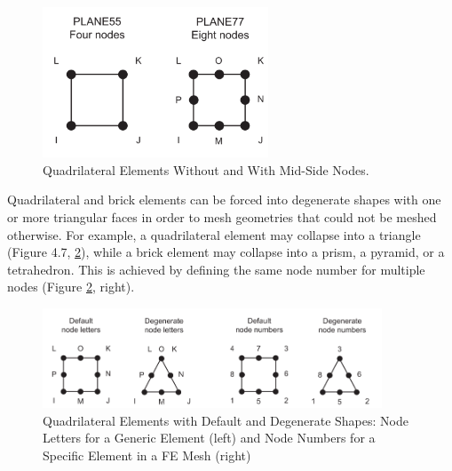 \documentclass[letterpaper,pdftex]{article}
\begin{document}
\begin{figure}[h]
   \centering
   \includegraphics[width=0.6\textwidth]{nodesinelement}
   \caption{Quadrilateral Elements Without and With Mid-Side Nodes.}
   \label{fig:nodes}
\end{figure}

Quadrilateral and brick elements can be forced into degenerate shapes with one or more triangular faces in order to mesh geometries that could not be meshed otherwise. For example, a quadrilateral element may collapse into a triangle (Figure 4.7, \ref{fig:nodes_elements}), while a brick element may collapse into a prism, a pyramid, or a tetrahedron. This is achieved by defining the same node number for multiple nodes (Figure \ref{fig:nodes_elements}, right).

\begin{figure}[h]
   \centering
   \includegraphics[width=0.9\textwidth]{shapesandnodes}
   \caption{Quadrilateral Elements with Default and Degenerate Shapes: Node Letters for a Generic Element (left) and Node Numbers for a Specific Element in a FE Mesh (right)}
   \label{fig:nodes_elements}
\end{figure}
\end{document}
